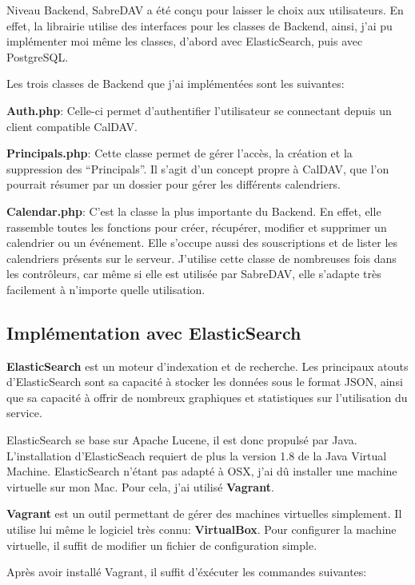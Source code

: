 Niveau Backend, SabreDAV a été conçu pour laisser le choix aux utilisateurs. En effet, la librairie utilise des interfaces pour les classes de Backend, ainsi, j'ai pu implémenter moi même les classes, d'abord avec ElasticSearch, puis avec PostgreSQL.

Les trois classes de Backend que j'ai implémentées sont les suivantes:

\textbf{Auth.php}: Celle-ci permet d'authentifier l'utilisateur se connectant depuis un client compatible CalDAV.

\textbf{Principals.php}: Cette classe permet de gérer l'accès, la création et la suppression des ``Principals''. Il s'agit d'un concept propre à CalDAV, que l'on pourrait résumer par un dossier pour gérer les différents calendriers.

\textbf{Calendar.php}: C'est la classe la plus importante du Backend. En effet, elle rassemble toutes les fonctions pour créer, récupérer, modifier et supprimer un calendrier ou un événement. Elle s'occupe aussi des souscriptions et de lister les calendriers présents sur le serveur. J'utilise cette classe de nombreuses fois dans les contrôleurs, car même si elle est utilisée par SabreDAV, elle s'adapte très facilement à n'importe quelle utilisation.

\subsection{Implémentation avec ElasticSearch}

\textbf{ElasticSearch} est un moteur d'indexation et de recherche. Les principaux atouts d'ElasticSearch sont sa capacité à stocker les données sous le format JSON, ainsi que sa capacité à offrir de nombreux graphiques et statistiques sur l'utilisation du service.

ElasticSearch se base sur Apache Lucene, il est donc propulsé par Java. L'installation d'ElasticSeach requiert de plus la version 1.8 de la Java Virtual Machine. ElasticSearch n'étant pas adapté à OSX, j'ai dû installer une machine virtuelle sur mon Mac. Pour cela, j'ai utilisé \textbf{Vagrant}.

\textbf{Vagrant} est un outil permettant de gérer des machines virtuelles simplement. Il utilise lui même le logiciel très connu: \textbf{VirtualBox}. Pour configurer la machine virtuelle, il suffit de modifier un fichier de configuration simple.

Après avoir installé Vagrant, il suffit d'éxécuter les commandes suivantes:

